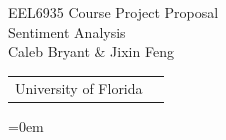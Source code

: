 \documentclass{beamer}
\begin{document}
{
\begin{frame}[plain,c]
\begin{center}
  {\color[RGB]{241,243,186}
{\huge EEL6935 Course Project Proposal\\
    \vspace*{0.5em}
    Sentiment Analysis}\\
  \vspace*{1.8in}
    Caleb Bryant \& Jixin Feng \\
    \vspace*{1em}
  \begin{tabular}{cc}
  University of Florida
   \end{tabular}
}
  \end{center}
\hoffset=0em
\end{frame}}
\end{document}
